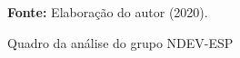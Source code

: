\begin{figure}[ht!]
\centering

\caption{\textmd{Quadro da análise do grupo NDEV-ESP}}
\label{fig:quadro:grupondevesp}

\par\medskip\textbf{Fonte:} Elaboração do autor (2020). \par\medskip

\end{figure}

